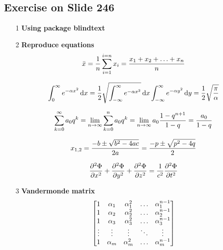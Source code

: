 \documentclass[paper=a4, fontsize=11pt]{scrartcl} %
\numberwithin{equation}{section} %
\numberwithin{figure}{section} %
\numberwithin{table}{section} %
\newcommand*{\dif}{\mathop{}\!\mathrm{d}}
\begin{document}
	\subsection{Exercise on Slide 246}
		\begin{enumerate}
			\item[1] \textbf{Using package blindtext} \newline
				\blindmathpaper
			
			\item[2] \textbf{Reproduce equations} \newline
				\begin{equation}\notag
					\bar{x}=\dfrac{1}{n}\sum_{i=1}^{i=n} x_i=\dfrac{x_1+x_2+\ldots+x_n}{n} 
				\end{equation}
				
				\begin{equation}\notag
					\int_0^\infty e^{-\alpha x^2} \dif{x}=\dfrac{1}{2} \sqrt{\int_{-\infty}^\infty e^{-\alpha x^2}}\dif{x} \int_{-\infty}^\infty e^{-\alpha y^2}\dif{y} =\dfrac{1}{2} \sqrt{\dfrac{\pi}{\alpha}}
				\end{equation}
				
				\begin{equation}\notag
					\sum_{k=0}^\infty a_0q^k=\lim_{n\rightarrow \infty}\sum_{k=0}^n a_0q^k=\lim_{n\rightarrow \infty}a_0 \dfrac{1-q^{n+1}}{1-q}=\dfrac{a_0}{1-q}
				\end{equation}
				
				\begin{equation}\notag
					x_{1,2}=\dfrac{-b\pm \sqrt{b^2-4ac}}{2a}=\dfrac{-p\pm \sqrt{p^2-4q}}{2}
				\end{equation}
				
				\begin{equation}\notag
					\dfrac{\partial^2 \Phi}{\partial x^2}+\dfrac{\partial^2 \Phi}{\partial y^2}+\dfrac{\partial^2 \Phi}{\partial z^2}=\dfrac{1}{c^2}\dfrac{\partial^2 \Phi}{\partial t^2}
				\end{equation}
	
			\item[3] \textbf{Vandermonde matrix}
				\begin{equation}\notag
					\left[\begin{matrix}
						1 & \alpha_1 & \alpha^2_1 &\ldots &\alpha^{n-1}_1 \\
						1 & \alpha_2 & \alpha^2_2 &\ldots &\alpha^{n-1}_2 \\
						1 & \alpha_3 & \alpha^2_3 &\ldots &\alpha^{n-1}_3 \\
						\vdots & \vdots & \vdots & \ddots & \vdots \\
						1 & \alpha_m & \alpha^2_m &\ldots &\alpha^{n-1}_m
					\end{matrix}\right]
				\end{equation}
		\end{enumerate}
\end{document}
